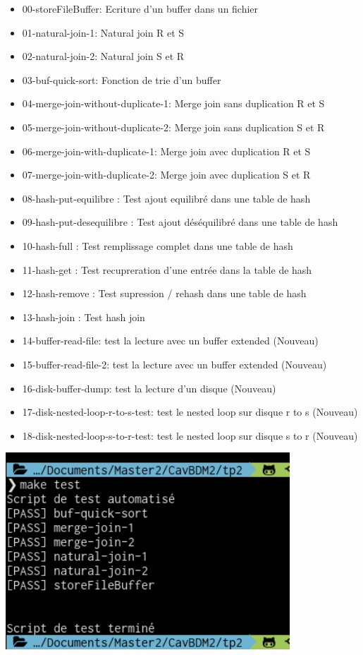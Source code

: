 \documentclass[a4paper]{article}
\begin{document}
\begin{itemize}
  \item 00-storeFileBuffer: Ecriture d'un buffer dans un fichier
  \item 01-natural-join-1: Natural join R et S
  \item 02-natural-join-2: Natural join S et R
  \item 03-buf-quick-sort: Fonction de trie d'un buffer
  \item 04-merge-join-without-duplicate-1: Merge join sans duplication R et S
  \item 05-merge-join-without-duplicate-2: Merge join sans duplication S et R
  \item 06-merge-join-with-duplicate-1: Merge join avec duplication R et S
  \item 07-merge-join-with-duplicate-2: Merge join avec duplication S et R
  \item 08-hash-put-equilibre : Test ajout equilibré dans une table de hash
  \item 09-hash-put-desequilibre : Test ajout déséquilibré dans une table de hash
  \item 10-hash-full : Test remplissage complet dans une table de hash
  \item 11-hash-get : Test recupreration d'une entrée dans la table de hash
  \item 12-hash-remove : Test supression / rehash dans une table de hash
  \item 13-hash-join : Test hash join
  \item 14-buffer-read-file: test la lecture avec un buffer extended (Nouveau)
  \item 15-buffer-read-file-2: test la lecture avec un buffer extended  (Nouveau)
  \item 16-disk-buffer-dump: test la lecture d'un disque (Nouveau)
  \item 17-disk-nested-loop-r-to-s-test: test le nested loop sur disque r to s (Nouveau)
  \item 18-disk-nested-loop-s-to-r-test: test le nested loop sur disque s to r (Nouveau)
\end{itemize}

\includegraphics[width=0.8\textwidth]{test.png}
\end{document}
